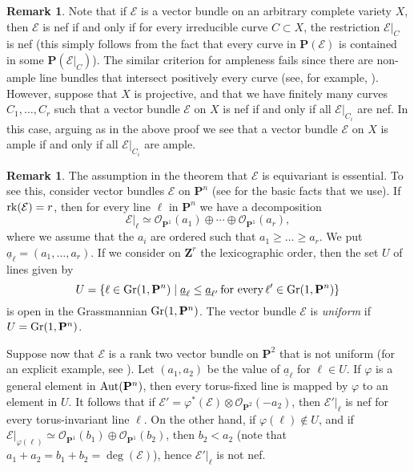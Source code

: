 \documentclass[12pt]{amsart}
\theoremstyle{definition}
\newtheorem{remark}[lemma]{Remark}
\theoremstyle{remark}
\begin{document}
\begin{remark}\label{general_variety}
Note that if ${\mathcal{E}}$ is a vector bundle on an arbitrary complete variety $X$, then ${\mathcal{E}}$ is nef
if and only if for every irreducible curve $C\subset X$, the restriction ${\mathcal{E}}\vert_C$ is nef
(this simply follows from the fact that every curve in ${{\mathbf P}}({\mathcal{E}})$ is contained in some
${{\mathbf P}}({\mathcal{E}}\vert_C)$). The similar criterion for ampleness fails since there are non-ample line bundles 
that intersect positively every curve (see, for example,  \cite[Chap. I, \S 10]{Ample}).
However, suppose that $X$ is projective, and that we have finitely many curves $C_1,\ldots,C_r$
such that a vector bundle ${\mathcal{E}}$ on $X$ is nef if and only if all ${\mathcal{E}}\vert_{C_i}$ are nef. In this case,
arguing as in the above proof we see that a vector bundle ${\mathcal{E}}$ on $X$ is ample if and only if 
all ${\mathcal{E}}\vert_{C_i}$ are ample.
\end{remark}

\begin{remark}\label{non_toric}
The assumption in the theorem that ${\mathcal{E}}$ is equivariant  is essential.
To see this, consider vector bundles ${\mathcal{E}}$ on ${{\mathbf P}}^n$ (see \cite[Section 2.2]{OSS}
for the basic facts that we use). If ${\rm rk}({\mathcal{E}})=r$, then for every line $\ell$ in ${{\mathbf P}}^n$
we have a decomposition 
$${\mathcal{E}}\vert_{\ell}\simeq{\mathcal{O}}_{{{\mathbf P}}^1}(a_1)\oplus\cdots\oplus{\mathcal{O}}_{{{\mathbf P}}^1}(a_r),$$
where we assume that the $a_i$ are ordered such that $a_1\geq\ldots\geq a_r$.
We put $\underline{a}_{\ell}=(a_1,\ldots,a_r)$. If we consider on ${{\mathbf Z}}^r$ the lexicographic order,
then the set $U$  of lines given by
$$U=\{\ell \in {\rm Gr}(1,{{\mathbf P}}^n)\mid \underline{a}_{\ell}\leq \underline{a}_{\ell'}\,\text{for every}\, \ell'\in {\rm Gr}(1,{{\mathbf P}}^n)\}$$
is open in the Grassmannian ${\rm Gr}(1,{{\mathbf P}}^n)$. 
The vector bundle ${\mathcal{E}}$ is \emph{uniform} if $U={\rm Gr}(1,{{\mathbf P}}^n)$.

Suppose now that ${\mathcal{E}}$ is a rank two vector bundle on ${{\mathbf P}}^2$ that is not uniform (for an explicit example, see  \cite[Theorem 2.2.5]{OSS}). Let $(a_1,a_2)$ be the value of 
$\underline{a}_{\ell}$ for $\ell\in U$. If ${\varphi}$ is a general element in ${\rm Aut}({{\mathbf P}}^n)$, then 
every torus-fixed line is mapped by ${\varphi}$ to an element in $U$. It follows that if ${\mathcal{E}}'={\varphi}^*({\mathcal{E}})\otimes{\mathcal{O}}_{{{\mathbf P}}^2}(-a_2)$,
then ${\mathcal{E}}'\vert_{\ell}$ is nef for every torus-invariant line $\ell$. On the other hand, if 
${\varphi}(\ell)\not\in U$, and if ${\mathcal{E}}\vert_{{\varphi}(\ell)}\simeq{\mathcal{O}}_{{{\mathbf P}}^1}(b_1)\oplus
{\mathcal{O}}_{{{\mathbf P}}^1}(b_2)$, then $b_2<a_2$ (note that $a_1+a_2=b_1+b_2=\deg({\mathcal{E}})$), hence
${\mathcal{E}}'\vert_{\ell}$ is not nef.
\end{remark}
\end{document}
